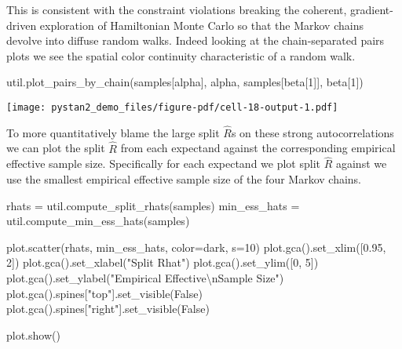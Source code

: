 \documentclass[
  letterpaper,
  DIV=11,
  numbers=noendperiod]{scrartcl}
\newenvironment{Shaded}{\begin{snugshade}}{\end{snugshade}}
\newcommand{\CharTok}[1]{\textcolor[rgb]{0.13,0.47,0.30}{#1}}
\newcommand{\DecValTok}[1]{\textcolor[rgb]{0.68,0.00,0.00}{#1}}
\newcommand{\FloatTok}[1]{\textcolor[rgb]{0.68,0.00,0.00}{#1}}
\newcommand{\NormalTok}[1]{\textcolor[rgb]{0.00,0.23,0.31}{#1}}
\newcommand{\OperatorTok}[1]{\textcolor[rgb]{0.37,0.37,0.37}{#1}}
\newcommand{\StringTok}[1]{\textcolor[rgb]{0.13,0.47,0.30}{#1}}
\newcommand{\VariableTok}[1]{\textcolor[rgb]{0.07,0.07,0.07}{#1}}
\begin{document}
This is consistent with the constraint violations breaking the coherent,
gradient-driven exploration of Hamiltonian Monte Carlo so that the
Markov chains devolve into diffuse random walks. Indeed looking at the
chain-separated pairs plots we see the spatial color continuity
characteristic of a random walk.

\begin{Shaded}
\begin{Highlighting}[]
\NormalTok{util.plot\_pairs\_by\_chain(samples[}\StringTok{\textquotesingle{}alpha\textquotesingle{}}\NormalTok{], }\StringTok{\textquotesingle{}alpha\textquotesingle{}}\NormalTok{, }
\NormalTok{                         samples[}\StringTok{\textquotesingle{}beta[1]\textquotesingle{}}\NormalTok{], }\StringTok{\textquotesingle{}beta[1]\textquotesingle{}}\NormalTok{)}
\end{Highlighting}
\end{Shaded}

\texttt{[image: pystan2\_demo\_files/figure-pdf/cell-18-output-1.pdf]}

To more quantitatively blame the large split \(\hat{R}\)s on these
strong autocorrelations we can plot the split \(\hat{R}\) from each
expectand against the corresponding empirical effective sample size.
Specifically for each expectand we plot split \(\hat{R}\) against we use
the smallest empirical effective sample size of the four Markov chains.

\begin{Shaded}
\begin{Highlighting}[]
\NormalTok{rhats }\OperatorTok{=}\NormalTok{ util.compute\_split\_rhats(samples)}
\NormalTok{min\_ess\_hats }\OperatorTok{=}\NormalTok{ util.compute\_min\_ess\_hats(samples)}

\NormalTok{plot.scatter(rhats, min\_ess\_hats, color}\OperatorTok{=}\NormalTok{dark, s}\OperatorTok{=}\DecValTok{10}\NormalTok{)}
\NormalTok{plot.gca().set\_xlim([}\FloatTok{0.95}\NormalTok{, }\DecValTok{2}\NormalTok{])}
\NormalTok{plot.gca().set\_xlabel(}\StringTok{"Split Rhat"}\NormalTok{)}
\NormalTok{plot.gca().set\_ylim([}\DecValTok{0}\NormalTok{, }\DecValTok{5}\NormalTok{])}
\NormalTok{plot.gca().set\_ylabel(}\StringTok{"Empirical Effective}\CharTok{\textbackslash{}n}\StringTok{Sample Size"}\NormalTok{)}
\NormalTok{plot.gca().spines[}\StringTok{"top"}\NormalTok{].set\_visible(}\VariableTok{False}\NormalTok{)}
\NormalTok{plot.gca().spines[}\StringTok{"right"}\NormalTok{].set\_visible(}\VariableTok{False}\NormalTok{)}

\NormalTok{plot.show()}
\end{Highlighting}
\end{Shaded}
\end{document}
